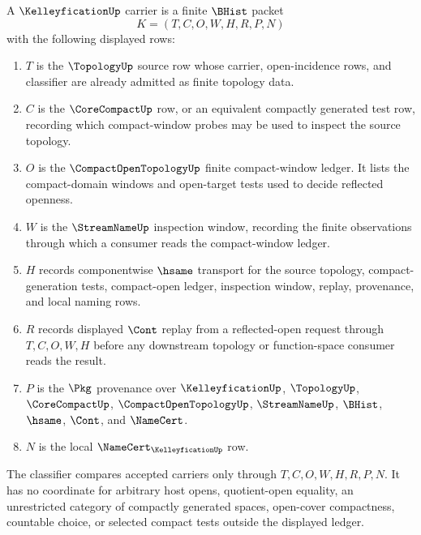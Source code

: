 \begin{definition}
\label{def:kelleyfication-carrier}
A $\KelleyficationUp$ carrier is a finite $\BHist$ packet
$$
K=(T,C,O,W,H,R,P,N)
$$
with the following displayed rows:
\begin{enumerate}
\item $T$ is the $\TopologyUp$ source row whose carrier, open-incidence rows, and classifier are already admitted as finite topology data.
\item $C$ is the $\CoreCompactUp$ row, or an equivalent compactly generated test row, recording which compact-window probes may be used to inspect the source topology.
\item $O$ is the $\CompactOpenTopologyUp$ finite compact-window ledger. It lists the compact-domain windows and open-target tests used to decide reflected openness.
\item $W$ is the $\StreamNameUp$ inspection window, recording the finite observations through which a consumer reads the compact-window ledger.
\item $H$ records componentwise $\hsame$ transport for the source topology, compact-generation tests, compact-open ledger, inspection window, replay, provenance, and local naming rows.
\item $R$ records displayed $\Cont$ replay from a reflected-open request through $T,C,O,W,H$ before any downstream topology or function-space consumer reads the result.
\item $P$ is the $\Pkg$ provenance over $\KelleyficationUp$, $\TopologyUp$, $\CoreCompactUp$, $\CompactOpenTopologyUp$, $\StreamNameUp$, $\BHist$, $\hsame$, $\Cont$, and $\NameCert$.
\item $N$ is the local $\NameCert_{\KelleyficationUp}$ row.
\end{enumerate}
The classifier compares accepted carriers only through $T,C,O,W,H,R,P,N$. It has no coordinate for arbitrary host opens, quotient-open equality, an unrestricted category of compactly generated spaces, open-cover compactness, countable choice, or selected compact tests outside the displayed ledger.
\end{definition}

